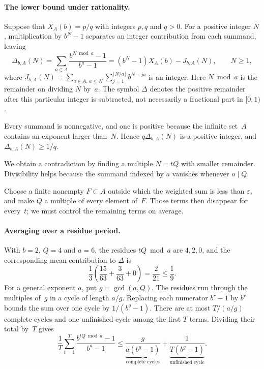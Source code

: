 \documentclass[10pt]{article}
\begin{document}
\paragraph{The lower bound under rationality.}
Suppose that $X_A(b)=p/q$ with integers $p,q$ and $q>0$. For a positive integer $N$, multiplication by $b^N-1$ separates an integer contribution from each summand, leaving
\begin{equation}\label{eq:worked-displacement}
 \Delta_{b,A}(N)=\sum_{a\in A}\frac{b^{N\bmod a}-1}{b^a-1}
 =(b^N-1)X_A(b)-J_{b,A}(N),\qquad N\ge1,
\end{equation}
where $J_{b,A}(N)=\sum_{a\in A,\,a\le N}\sum_{j=1}^{\lfloor N/a\rfloor}b^{N-ja}$ is an integer. Here $N\bmod a$ is the remainder on dividing $N$ by~$a$. The symbol $\Delta$ denotes the positive remainder after this particular integer is subtracted, not necessarily a fractional part in $[0,1)$.

Every summand is nonnegative, and one is positive because the infinite set~$A$ contains an exponent larger than~$N$. Hence $q\Delta_{b,A}(N)$ is a positive integer, and
\(\Delta_{b,A}(N)\ge1/q\).

We obtain a contradiction by finding a multiple $N=tQ$ with smaller remainder. Divisibility helps because the summand indexed by $a$ vanishes whenever $a\mid Q$.

Choose a finite nonempty $F\subset A$ outside which the weighted sum is less than $\varepsilon$, and make $Q$ a multiple of every element of~$F$. Those terms then disappear for every~$t$; we must control the remaining terms on average.

\paragraph{Averaging over a residue period.}
With $b=2$, $Q=4$ and $a=6$, the residues $tQ\bmod a$ are $4,2,0$, and the corresponding mean contribution to $\Delta$ is
\[
 \frac13\left(\frac{15}{63}+\frac3{63}+0\right)=\frac2{21}\le\frac19.
\]
For a general exponent $a$, put $g=\gcd(a,Q)$. The residues run through the multiples of~$g$ in a cycle of length $a/g$. Replacing each numerator $b^r-1$ by $b^r$ bounds the sum over one cycle by $1/(b^g-1)$. There are at most $T/(a/g)$ complete cycles and one unfinished cycle among the first $T$ terms. Dividing their total by~$T$ gives
\begin{equation}\label{eq:worked-orbit}
 \frac1T\sum_{t=1}^T\frac{b^{tQ\bmod a}-1}{b^a-1}
 \le \underbrace{\frac{g}{a(b^g-1)}}_{\text{complete cycles}}
    +\underbrace{\frac1{T(b^g-1)}}_{\text{unfinished cycle}}.
\end{equation}
\end{document}
